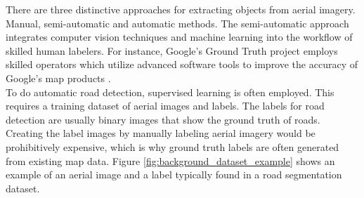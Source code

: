 There are three distinctive approaches for extracting objects from aerial imagery. Manual, semi-automatic and automatic methods. The semi-automatic approach integrates computer vision techniques and machine learning into the workflow of skilled human labelers. For instance, Google's Ground Truth project employs skilled operators which utilize advanced software tools to improve the accuracy of Google's map products \citep{Ground_truth}.\\

To do automatic road detection, supervised learning is often employed. This requires a training dataset of aerial images and labels. The labels for road detection are usually binary images that show the ground truth of roads. Creating the label images by manually labeling aerial imagery would be prohibitively expensive, which is why ground truth labels are often generated from existing map data. Figure \ref{fig:background_dataset_example} shows an example of an aerial image and a label typically found in a road segmentation dataset.\\

